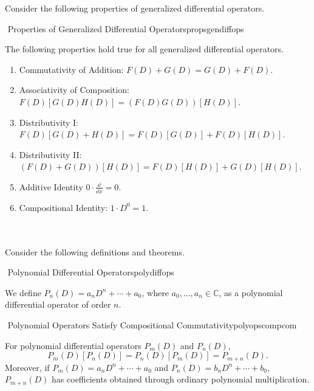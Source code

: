         Consider the following properties of generalized differential operators.
        \begin{theorem}{\Stop\,\,Properties of Generalized Differential Operators}{propsgendiffops}
            
            The following properties hold true for all generalized differential operators.
            \begin{enumerate}
                \item Commutativity of Addition: \(F(D)+G(D)=G(D)+F(D)\).
                \item Associativity of Composition: \(F(D)[G(D)H(D)]=(F(D)G(D))[H(D)]\).
                \item Distributivity I: \(F(D)[G(D)+H(D)]=F(D)[G(D)]+F(D)[H(D)]\).
                \item Distributivity II: \((F(D)+G(D))[H(D)]=F(D)[H(D)]+G(D)[H(D)]\).
                \item Additive Identity \(0\cdot\frac{\dd}{\dd x}=0\).
                \item Compositional Identity: \(1\cdot D^0=1\).
            \end{enumerate}

        \end{theorem}
        \vphantom
        \\
        \\
        Consider the following definitions and theorems.
        \begin{definition}{\Stop\,\,Polynomial Differential Operators}{polydiffops}

            We define \(P_n(D)=a_nD^n+\cdots+a_0\), where \(a_0,\ldots,a_n\in\mathbb{C}\), as a polynomial differential operator of order \(n\).
            
        \end{definition}
        \begin{theorem}{\Stop\,\,Polynomial Operators Satisfy Compositional Commutativity}{polyopscompcom}

            For polynomial differential operators \(P_m(D)\) and \(P_n(D)\),
            \begin{equation*}
                P_m(D)[P_n(D)]=P_n(D)[P_m(D)]=P_{m+n}(D).
            \end{equation*}
            Moreover, if \(P_m(D)=a_nD^n+\cdots+a_0\) and \(P_n(D)=b_nD^n+\cdots+b_0\), \(P_{m+n}(D)\) has coefficients obtained through ordinary polynomial multiplication.
            
        \end{theorem}
